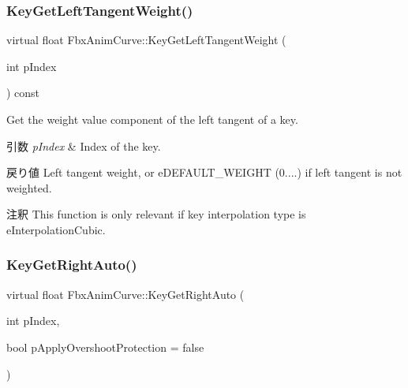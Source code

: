 \subsubsection{\texorpdfstring{Key\+Get\+Left\+Tangent\+Weight()}{KeyGetLeftTangentWeight()}}
{\footnotesize\ttfamily virtual float Fbx\+Anim\+Curve\+::\+Key\+Get\+Left\+Tangent\+Weight (\begin{DoxyParamCaption}\item[{int}]{p\+Index }\end{DoxyParamCaption}) const\hspace{0.3cm}{\ttfamily [pure virtual]}}

Get the weight value component of the left tangent of a key. 
\begin{DoxyParams}{引数}
{\em p\+Index} & Index of the key. \\
\hline
\end{DoxyParams}
\begin{DoxyReturn}{戻り値}
Left tangent weight, or e\+D\+E\+F\+A\+U\+L\+T\+\_\+\+W\+E\+I\+G\+HT (0....) if left tangent is not weighted. 
\end{DoxyReturn}
\begin{DoxyRemark}{注釈}
This function is only relevant if key interpolation type is e\+Interpolation\+Cubic. 
\end{DoxyRemark}
\mbox{\label{class_fbx_anim_curve_a55a43ce2a48ceccd753cdb10a7acf77e}} 
\subsubsection{\texorpdfstring{Key\+Get\+Right\+Auto()}{KeyGetRightAuto()}}
{\footnotesize\ttfamily virtual float Fbx\+Anim\+Curve\+::\+Key\+Get\+Right\+Auto (\begin{DoxyParamCaption}\item[{int}]{p\+Index,  }\item[{bool}]{p\+Apply\+Overshoot\+Protection = {\ttfamily false} }\end{DoxyParamCaption})\hspace{0.3cm}{\ttfamily [pure virtual]}}

